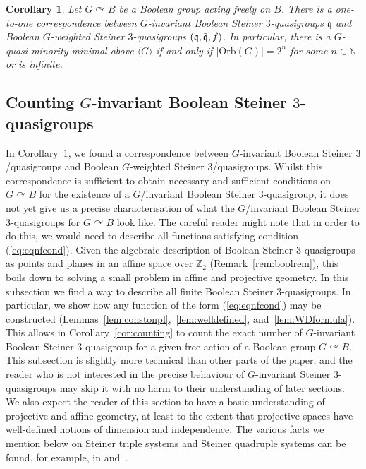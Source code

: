 \documentclass{article}
\newtheorem{corollary}[theorem]{Corollary}
\theoremstyle{remark}
\theoremstyle{definition}
\def\acts{\curvearrowright}
\begin{document}
\begin{corollary}\label{cor:correspondence} Let $G\acts B$ be a Boolean group acting freely on $B$. There is a one-to-one correspondence between $G$-invariant Boolean Steiner $3$-quasigroups $\mathfrak{q}$ and Boolean $G$-weighted Steiner $3$-quasigroups $(\mathfrak{q}, \Tilde{\mathfrak{q}}, f)$. In particular, there is a $G$-quasi-minority minimal above $\langle G \rangle$ if and only if $|\mathrm{Orb}(G)|=2^n$ for some $n\in\mathbb{N}$ or is infinite.  
\end{corollary}






\subsection{Counting \texorpdfstring{$G$}{G}-invariant Boolean Steiner \texorpdfstring{$3$}{3}-quasigroups}\label{sub:counting}
In Corollary~\ref{cor:correspondence}, we found a correspondence between $G$-invariant Boolean Steiner $3$\-/quasigroups and Boolean $G$-weighted Steiner $3$\-/quasigroups. Whilst this correspondence is sufficient to obtain necessary and sufficient conditions on $G\acts B$ for the existence of a $G$\-/invariant Boolean Steiner $3$-quasigroup, it does not yet give us a precise characterisation of what the $G$\-/invariant Boolean Steiner $3$-quasigroups for $G\acts B$ look like. The careful reader might note that in order to do this, we would need to describe all functions satisfying condition (\ref{eq:eqnfcond}). Given the algebraic description of Boolean Steiner $3$-quasigroups as points and planes in an affine space over $\mathbb{Z}_2$ (Remark~\ref{rem:boolrem}), this boils down to solving a small problem in affine and projective geometry. In this subsection we find a way to describe all finite Boolean Steiner $3$-quasigroups. In particular, we show how any function of the form (\ref{eq:eqnfcond}) may be constructed (Lemmas~\ref{lem:constonpl},~\ref{lem:welldefined}, and~\ref{lem:WDformula}). This allows in Corollary~\ref{cor:counting} to count the exact number of $G$-invariant Boolean Steiner $3$-quasigroup for a given free action of a Boolean group $G\acts B$.\\

This subsection is slightly more technical than other parts of the paper, and the reader who is not interested in the precise behaviour of $G$-invariant Steiner $3$-quasigroups may skip it with no harm to their understanding of later sections. We also expect the reader of this section to have a basic understanding of projective and affine geometry, at least to the extent that projective spaces have well-defined notions of dimension and independence. The various facts we mention below on Steiner triple systems and Steiner quadruple systems can be found, for example, in \cite{lindner1978steiner} and~\cite{dixon1996permutation}.
\end{document}
